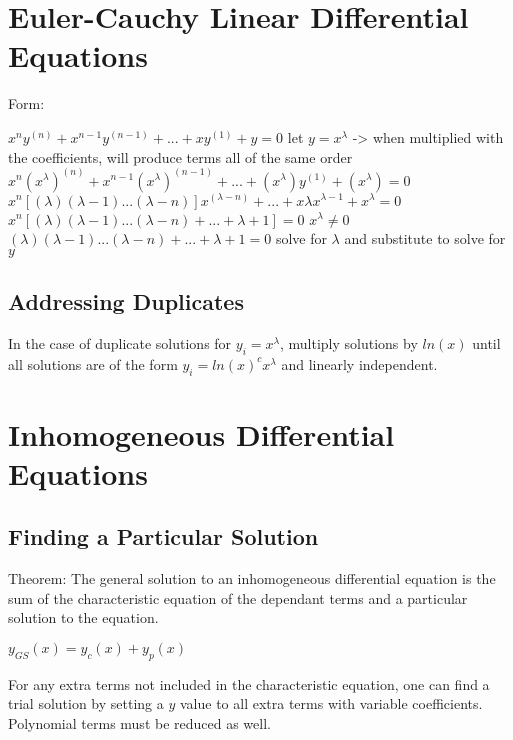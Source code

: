 \documentclass[12 pt, oneside]{book}
\begin{document}
\section{Euler-Cauchy Linear Differential Equations}
Form:\newline{}
\begin{mathline}
$x^{n}y^{(n)}+x^{n-1}y^{(n-1)}+...+xy^(1)+y=0$\newline{}
\indent let $y=x^\lambda$ -> when multiplied with the coefficients, will produce terms all of the same order\newline{}
$x^{n}(x^\lambda)^{(n)}+x^{n-1}(x^\lambda)^{(n-1)}+...+(x^\lambda)y^(1)+(x^\lambda)=0$\newline{}
$x^{n}[(\lambda)(\lambda-1)...(\lambda-n)]x^{(\lambda-n)}+...+x\lambda x^{\lambda-1}+x^\lambda=0$\newline{}
$x^{n}[(\lambda)(\lambda-1)...(\lambda-n)+...+\lambda+1]=0$\newline{}
$x^\lambda\neq 0$\newline{}
$(\lambda)(\lambda-1)...(\lambda-n)+...+\lambda+1=0$\newline{}
solve for $\lambda$ and substitute to solve for $y$
\end{mathline}

\subsection{Addressing Duplicates}
In the case of duplicate solutions for $y_i=x^\lambda$, multiply solutions by $ln(x)$ until all solutions are of the form $y_i=ln(x)^{c}x^\lambda$ and linearly independent.

\section{Inhomogeneous Differential Equations}

\subsection{Finding a Particular Solution}

Theorem: The general solution to an inhomogeneous differential equation is the sum of the characteristic equation of the dependant terms and a particular solution to the equation.

$y_{GS}(x)=y_c(x)+y_p(x)$

For any extra terms not included in the characteristic equation, one can find a trial solution by setting a $y$ value to all extra terms with variable coefficients. Polynomial terms must be reduced as well.
\end{document}
